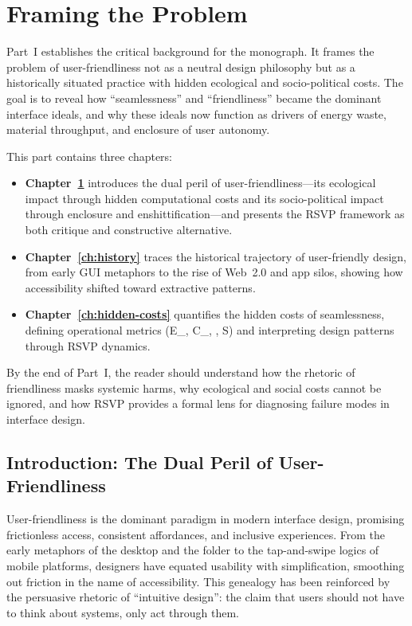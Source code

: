 \documentclass[openany]{book}
\newcommand{\Sent}{S} %
\newcommand{\Eint}{E_{\mathrm{int}}} %
\newcommand{\Cfoot}{C_{\mathrm{foot}}} %
\newcommand{\Auton}{\mathcal{A}} %
\begin{document}
\clearpage
{}
\tableofcontents
\clearpage
{}

\part{Framing the Problem}

Part~I establishes the critical background for the monograph. It frames the
problem of user-friendliness not as a neutral design philosophy but as a
historically situated practice with hidden ecological and socio-political
costs. The goal is to reveal how “seamlessness” and “friendliness” became
the dominant interface ideals, and why these ideals now function as drivers
of energy waste, material throughput, and enclosure of user autonomy.

This part contains three chapters:

\begin{itemize}
  \item \textbf{Chapter~\ref{ch:intro}} introduces the dual peril of
  user-friendliness—its ecological impact through hidden computational
  costs and its socio-political impact through enclosure and
  enshittification—and presents the RSVP framework as both critique and
  constructive alternative.
  \item \textbf{Chapter~\ref{ch:history}} traces the historical trajectory
  of user-friendly design, from early GUI metaphors to the rise of Web~2.0
  and app silos, showing how accessibility shifted toward extractive
  patterns.
  \item \textbf{Chapter~\ref{ch:hidden-costs}} quantifies the hidden costs
  of seamlessness, defining operational metrics (\Eint, \Cfoot, \Auton,
  \Sent) and interpreting design patterns through RSVP dynamics.
\end{itemize}

By the end of Part~I, the reader should understand how the rhetoric of
friendliness masks systemic harms, why ecological and social costs cannot be
ignored, and how RSVP provides a formal lens for diagnosing failure modes in
interface design.


\chapter{Introduction: The Dual Peril of User-Friendliness}
\label{ch:intro}

User-friendliness is the dominant paradigm in modern interface design, promising frictionless access, consistent affordances, and inclusive experiences. From the early metaphors of the desktop and the folder to the tap-and-swipe logics of mobile platforms, designers have equated usability with simplification, smoothing out friction in the name of accessibility. This genealogy has been reinforced by the persuasive rhetoric of “intuitive design”: the claim that users should not have to think about systems, only act through them.  
\end{document}

